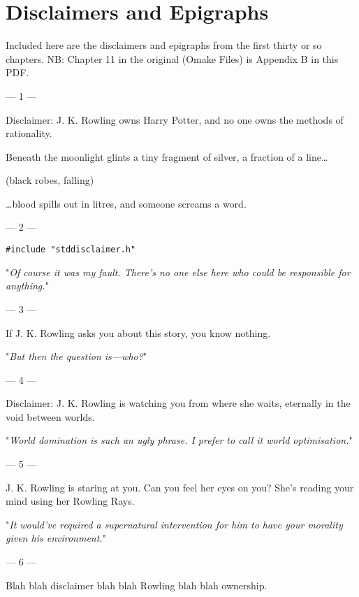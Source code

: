 \chapter{Disclaimers and Epigraphs}

Included here are the disclaimers and epigraphs from the first thirty or so
chapters. NB: Chapter 11 in the original (Omake Files) is Appendix B in this PDF.

{ %
\setlength{\parindent}{0pt}
\setlength{\parskip}{1em}

\filbreak
--- 1 ---

Disclaimer: J. K. Rowling owns Harry Potter, and no one owns the methods of rationality.

\begin{em}
Beneath the moonlight glints a tiny fragment of silver, a fraction of a line{\ldots}

(black robes, falling)

{\ldots}blood spills out in litres, and someone screams a word.
\end{em}

\filbreak
--- 2 ---

\texttt{\#include "stddisclaimer.h"}

"\emph{Of course it was my fault. There's no one else here who could be 
responsible for anything.}"

\filbreak
--- 3 ---

If J. K. Rowling asks you about this story, you know nothing.

"\emph{But then the question is---who?}"

\filbreak
--- 4 ---

Disclaimer: J. K.
Rowling is watching you from where she waits, eternally in the void between
worlds.

"\emph{World domination is such an ugly phrase. I prefer to call it world
optimisation.}"

\filbreak
--- 5 ---

J. K. Rowling is
staring at you. Can you feel her eyes on you? She's reading your mind using her
Rowling Rays.

"\emph{It would've required a \emph{supernatural intervention} for him to have
\emph{your} morality given \emph{his} environment.}"

\filbreak
--- 6 ---

Blah blah
disclaimer blah blah Rowling blah blah ownership.

}
